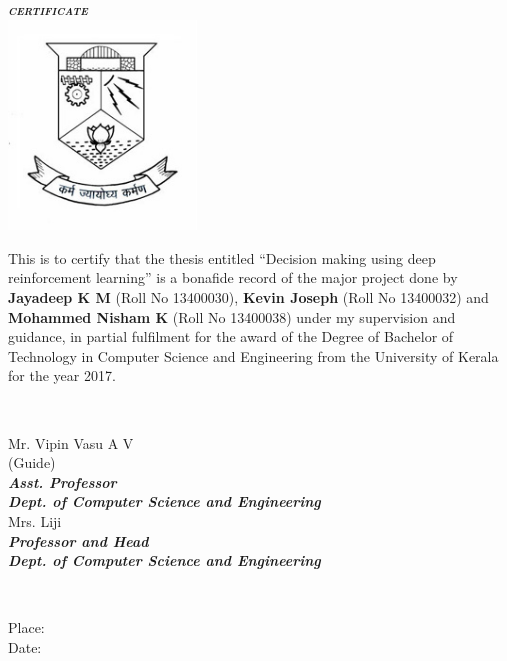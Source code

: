 \documentclass[twoside,letterpaper]{article}
\begin{document}
	\begin{titlepage}
		\begin{centering}
			\textbf{\textit{\LARGE\textsc{{certificate}}}}\\[0.5cm]
			\includegraphics[width=5cm]{images/logo.jpg}\\

		\end{centering}

		\large{This is to certify that the thesis entitled ``Decision making using deep reinforcement learning'' is a bonafide record of the major project done by \textbf{Jayadeep K M} (Roll No 13400030), \textbf{Kevin Joseph} (Roll No 13400032) and \textbf{Mohammed Nisham K} (Roll No 13400038) under my supervision and guidance, in partial fulfilment for the award of the Degree of Bachelor of Technology in Computer Science and Engineering from the University of Kerala for the year 2017.}\\[1.5cm]

		\begin{minipage}{0.4\textwidth}
		\begin{flushleft}
		\end{flushleft}
		\end{minipage}
		~
		\begin{minipage}{0.6\textwidth}
		\begin{centering} \large
		\large{Mr. Vipin Vasu A V}\\
		\small{(Guide)}\\
		\small{\textit{\textbf{Asst. Professor}}}\\
		\small{\textit{\textbf{Dept. of Computer Science and Engineering}}}\\[1.5cm]

		\large{Mrs. Liji}\\
		\small{\textit{\textbf{Professor and Head}}}\\
		\small{\textit{\textbf{Dept. of Computer Science and Engineering}}}\\
		\end{centering}
		\end{minipage}\\[1.0cm]

		\begin{flushleft}
		Place: \\
		Date: \\
		\end{flushleft}
		\vfill %
	\end{titlepage}
\end{document}
